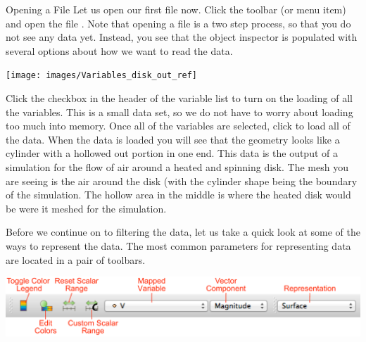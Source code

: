 \begin{exercise}{Opening a File}
  \label{ex:OpeningAFile}%
  Let us open our first file now.  Click the  
  toolbar (or menu item)~ and open the file
   .  Note that opening a
  file is a two step process, so that you do not see any data yet.
  Instead, you see that the object inspector is populated with several
  options about how we want to read the data.

  \begin{inlinefig}
    \texttt{[image: images/Variables\_disk\_out\_ref]}
  \end{inlinefig}

  Click the checkbox in the header of the variable list to turn on the
  loading of all the variables.  This is a small data set, so we do not
  have to worry about loading too much into memory.  Once all of the
  variables are selected, click \apply to load all of the data.  When the
  data is loaded you will see that the geometry looks like a cylinder with
  a hollowed out portion in one end.  This data is the output of a
  simulation for the flow of air around a heated and spinning disk.  The
  mesh you are seeing is the air around the disk (with the cylinder shape
  being the boundary of the simulation.  The hollow area in the middle is
  where the heated disk would be were it meshed for the simulation.
\end{exercise}

Before we continue on to filtering the data, let us take a quick look at
some of the ways to represent the data.  The most common parameters for
representing data are located in a pair of toolbars.

 

\begin{inlinefig}
  \includegraphics[width=\linewidth]{images/DataRepresentationToolbars}
\end{inlinefig}


